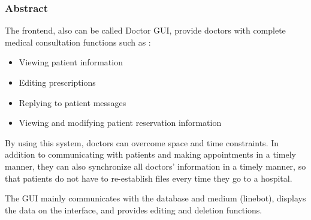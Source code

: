 \documentclass{article}
\begin{document}
\subsubsection*{Abstract}
The frontend, also can be called Doctor GUI, provide doctors with complete medical consultation functions such as :

\begin{itemize}
    \item Viewing patient information
    \item Editing prescriptions
    \item Replying to patient messages
    \item Viewing and modifying patient reservation information
\end{itemize}

By using this system, doctors can overcome space and 
time constraints. In addition to communicating with 
patients and making appointments in a timely manner, 
they can also synchronize all doctors' information 
in a timely manner, so that patients do not have to 
re-establish files every time they go to a hospital.

The GUI mainly communicates with the database and 
medium (linebot), displays the data on the interface, 
and provides editing and deletion functions. 

\end{document}
